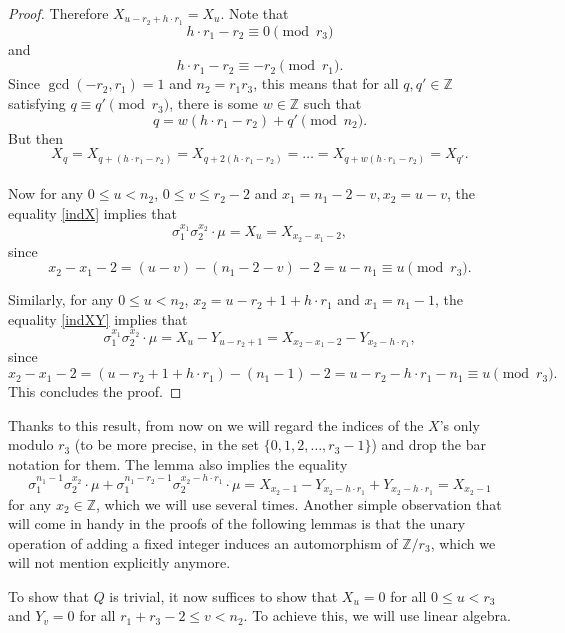 \documentclass[12pt,a4paper]{article}
\theoremstyle{definition}
\newcommand{\Z}{\mathbb{Z}}
\begin{document}
\begin{proof}
Therefore $X_{u -r_2+h\cdot r_1}=X_u$. Note that $$h\cdot r_1-r_2\equiv 0 \pmod{r_3}$$ and $$h\cdot r_1-r_2\equiv -r_2\pmod{r_1}.$$ Since $\gcd(-r_2,r_1)=1$ and $n_2=r_1r_3$, this means that for all $q,q'\in\Z$ satisfying $q\equiv q'\pmod{r_3}$, there is some $w\in\Z$ such that $$q=w(h\cdot r_1-r_2)+q' \pmod{n_2}.$$ But then $$X_q=X_{q+(h\cdot r_1-r_2)}=X_{q+2(h\cdot r_1-r_2)}=\dots=X_{q+w(h\cdot r_1-r_2)}=X_{q'}.$$

\paragraph*{}
Now for any $0\leq u<n_2$, $0\leq v\leq r_2-2$ and $x_1=n_1-2-v,x_2=u-v$, the equality \eqref{indX} implies that $$\sigma_1^{x_1}\sigma_2^{x_2}\cdot \mu=X_u=X_{x_2-x_1-2},$$ since $$x_2-x_1-2=(u-v)-(n_1-2-v)-2=u-n_1\equiv u\pmod {r_3}.$$

Similarly, for any $0\leq u<n_2$, $x_2=u-r_2+1+h\cdot r_1$ and $x_1=n_1-1$, the equality \eqref{indXY} implies that 
$$\sigma_1^{x_1}\sigma_2^{x_2}\cdot \mu=X_u-Y_{u-r_2+1}=X_{x_2-x_1-2}-Y_{x_2-h\cdot r_1},$$ since 
$$x_2-x_1-2=(u-r_2+1+h\cdot r_1)-(n_1-1)-2=u-r_2-h\cdot r_1-n_1\equiv u \pmod{r_3}.$$
This concludes the proof.
\end{proof}

Thanks to this result, from now on we will regard the indices of the $X$'s only modulo $r_3$ (to be more precise, in the set $\{0,1,2,\dots,r_3-1\}$) and drop the bar notation for them. The lemma also implies the equality
\begin{equation}\label{Ycancel}
\sigma_1^{n_1-1}\sigma_2^{x_2}\cdot \mu+\sigma_1^{n_1-r_2-1}\sigma_2^{x_2-h\cdot r_1}\cdot \mu=X_{x_2-1}-Y_{x_2-h\cdot r_1}+Y_{x_2-h\cdot r_1}= X_{x_2-1}
\end{equation}
for any $x_2\in\Z$, which we will use several times. Another simple observation that will come in handy in the proofs of the following lemmas is that the unary operation of adding a fixed integer induces an automorphism of $\Z/r_3$, which we will not mention explicitly anymore.

To show that $Q$ is trivial, it now suffices to show that $X_u=0$ for all $0\leq u< r_3$ and $Y_v=0$ for all $r_1+r_3-2\leq v< n_2$. To achieve this, we will use linear algebra.

%
\end{document}
